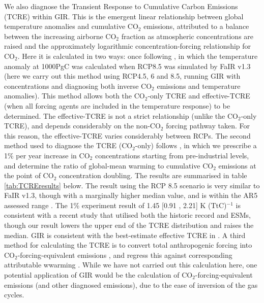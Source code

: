 \documentclass[gmd, manuscript]{copernicus}
\begin{document}
We also diagnose the Transient Response to Cumulative Carbon Emissions (TCRE) within GIR. This is the emergent linear relationship between global temperature anomalies and cumulative CO$_2$ emissions, attributed to a balance between the increasing airborne CO$_2$ fraction as atmospheric concentrations are raised and the approximately logarithmic concentration-forcing relationship for CO$_2$. Here it is calculated in two ways: once following \citeauthor{Smith2017}, in which the temperature anomaly at 1000PgC was calculated when RCP8.5 was simulated by FaIR v1.3 (here we carry out this method using RCP4.5, 6 and 8.5, running GIR with concentrations and diagnosing both inverse CO$_2$ emissions and temperature anomalies). This method allows both the CO$_2$-only TCRE and effective-TCRE (when all forcing agents are included in the temperature response) to be determined. The effective-TCRE is not a strict relationship (unlike the CO$_2$-only TCRE), and depends considerably on the non-CO$_2$ forcing pathway taken. For this reason, the effective-TCRE varies considerably between RCPs. The second method used to diagnose the TCRE (CO$_2$-only) follows \cite{Gillett2013}, in which we prescribe a 1\% per year increase in CO$_2$ concentrations starting from pre-industrial levels, and determine the ratio of global-mean warming to cumulative CO$_2$ emissions at the point of CO$_2$ concentration doubling. The results are summarised in table \ref{tab:TCREresults} below. The result using the RCP 8.5 scenario is very similar to FaIR v1.3, though with a marginally higher median value, and is within the AR5 assessed range \citep{Collins2013}. The 1\% experiment result of 1.45 [0.91 , 2.21] K (TtC)$^{-1}$ is consistent with a recent study \citep{Millar20160449} that utilised both the historic record and ESMs, though our result lowers the upper end of the TCRE distribution and raises the median. GIR is consistent with the best-estimate effective TCRE in \citeauthor{Millar20160449}. A third method for calculating the TCRE is to convert total anthropogenic forcing into CO$_2$-forcing-equivalent emissions \citep{Jenkins2018}, and regress this against corresponding attributable wwarming \citep{Haustein2017}. While we have not carried out this calculation here, one potential application of GIR would be the calculation of CO$_2$-forcing-equivalent emissions (and other diagnosed emissions), due to the ease of inversion of the gas cycles.
\end{document}
